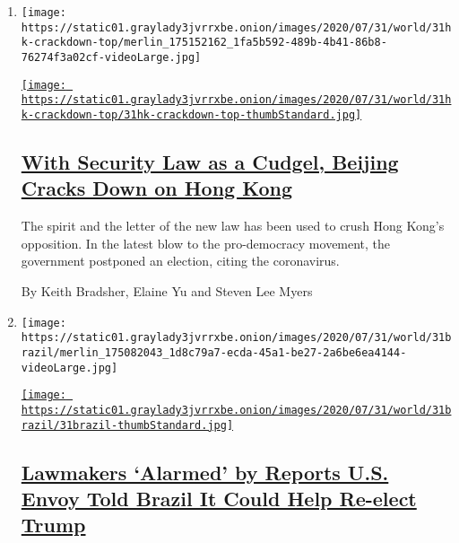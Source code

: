 \begin{enumerate}
\def\labelenumi{\arabic{enumi}.}
\item
  \texttt{[image: https://static01.graylady3jvrrxbe.onion/images/2020/07/31/world/31hk-crackdown-top/merlin\_175152162\_1fa5b592-489b-4b41-86b8-76274f3a02cf-videoLarge.jpg]}

  \href{/2020/07/31/world/asia/hong-kong-election-national-security-law.html}{\texttt{[image: https://static01.graylady3jvrrxbe.onion/images/2020/07/31/world/31hk-crackdown-top/31hk-crackdown-top-thumbStandard.jpg]}}

  \hypertarget{with-security-law-as-a-cudgel-beijing-cracks-down-on-hong-kong}{%
  \subsection{\texorpdfstring{\href{/2020/07/31/world/asia/hong-kong-election-national-security-law.html}{With
  Security Law as a Cudgel, Beijing Cracks Down on Hong
  Kong}}{With Security Law as a Cudgel, Beijing Cracks Down on Hong Kong}}\label{with-security-law-as-a-cudgel-beijing-cracks-down-on-hong-kong}}

  The spirit and the letter of the new law has been used to crush Hong
  Kong's opposition. In the latest blow to the pro-democracy movement,
  the government postponed an election, citing the coronavirus.

  By Keith Bradsher, Elaine Yu and Steven Lee Myers
\item
  \texttt{[image: https://static01.graylady3jvrrxbe.onion/images/2020/07/31/world/31brazil/merlin\_175082043\_1d8c79a7-ecda-45a1-be27-2a6be6ea4144-videoLarge.jpg]}

  \href{/2020/07/31/world/americas/brazil-trump-ethanol-chapman.html}{\texttt{[image: https://static01.graylady3jvrrxbe.onion/images/2020/07/31/world/31brazil/31brazil-thumbStandard.jpg]}}

  \hypertarget{lawmakers-alarmed-by-reports-us-envoy-told-brazil-it-could-help-re-elect-trump}{%
  \subsection{\texorpdfstring{\href{/2020/07/31/world/americas/brazil-trump-ethanol-chapman.html}{Lawmakers
  `Alarmed' by Reports U.S. Envoy Told Brazil It Could Help Re-elect
  Trump}}{Lawmakers `Alarmed' by Reports U.S. Envoy Told Brazil It Could Help Re-elect Trump}}\label{lawmakers-alarmed-by-reports-us-envoy-told-brazil-it-could-help-re-elect-trump}}


\end{enumerate}

